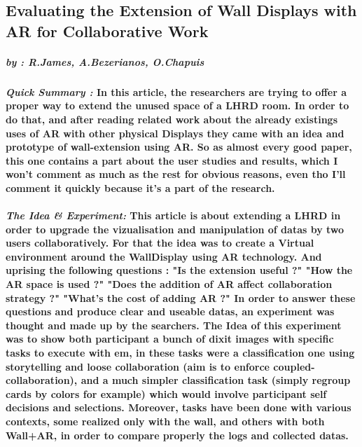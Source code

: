 \subsection{Evaluating the Extension of Wall Displays with AR for Collaborative Work}
    \subparagraph{by : R.James, A.Bezerianos, O.Chapuis}
    \cite{james2023evaluating}
    \paragraph{ \textit{Quick Summary :} 
                \newline
                \indent \indent \textnormal{In this article, the researchers are trying to offer a proper way to extend the unused space
                of a LHRD room. In order to do that, and after reading related work about the already existings uses of AR with other physical Displays
                they came with an idea and prototype of wall-extension using AR. }
                \indent \indent \textnormal{So as almost every good paper, this one contains a part about the user studies and results, which I won't 
                comment as much as the rest for obvious reasons, even tho I'll comment it quickly because it's a part of the research.} }
    
    \paragraph{ \textit{The Idea \& Experiment:} 
                \newline
                \indent \indent \textnormal{This article is about extending a LHRD in order to upgrade the vizualisation and manipulation of datas by two
                users collaboratively. For that the idea was to create a Virtual environment around the WallDisplay using AR technology. And uprising the following questions :
                \newline \indent "Is the extension useful ?" 
                \newline \indent "How the AR space is used ?"
                \newline \indent "Does the addition of AR affect collaboration strategy ?"
                \newline \indent "What's the cost of adding AR ?"}
                \indent \indent \textnormal{In order to answer these questions and produce clear and useable datas, an experiment was thought and made up by the searchers. 
                The Idea of this experiment was to show both participant a bunch of dixit images with specific tasks to execute with em, in these tasks were a classification 
                one using storytelling and loose collaboration (aim is to enforce coupled-collaboration), and a much simpler classification task (simply regroup cards by colors 
                for example) which would involve participant self decisions and selections. Moreover, tasks have been done with various contexts, some realized only with the wall,
                and others with both Wall+AR, in order to compare properly the logs and collected datas.}}

